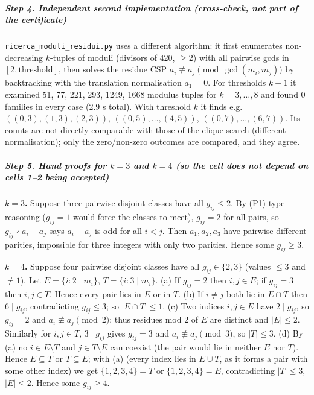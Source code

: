 \subparagraph{Step 4. Independent second implementation (cross-check,
not part of the
certificate)}\label{step-4.-independent-second-implementation-cross-check-not-part-of-the-certificate}

\texttt{ricerca\_moduli\_residui.py} uses a different algorithm: it
first enumerates non-decreasing \(k\)-tuples of moduli (divisors of 420,
\(\ge2\)) with all pairwise gcds in \([2,\text{threshold}]\), then
solves the residue CSP \(a_i\not\equiv a_j \pmod{\gcd(m_i,m_j)}\) by
backtracking with the translation normalisation \(a_1=0\). For
thresholds \(k-1\) it examined 51, 77, 221, 293, 1249, 1668 modulus
tuples for \(k=3,\dots,8\) and found 0 families in every case (2.9 s
total). With threshold \(k\) it finds e.g.~\(((0,3),(1,3),(2,3))\),
\(((0,5),\dots,(4,5))\), \(((0,7),\dots,(6,7))\). Its counts are not
directly comparable with those of the clique search (different
normalisation); only the zero/non-zero outcomes are compared, and they
agree.

\subparagraph{\texorpdfstring{Step 5. Hand proofs for \(k=3\) and
\(k=4\) (so the cell does not depend on cells 1--2 being
accepted)}{Step 5. Hand proofs for k=3 and k=4 (so the cell does not depend on cells 1--2 being accepted)}}\label{step-5.-hand-proofs-for-k3-and-k4-so-the-cell-does-not-depend-on-cells-12-being-accepted}

\textbf{\(k=3\).} Suppose three pairwise disjoint classes have all
\(g_{ij}\le 2\). By (P1)-type reasoning (\(g_{ij}=1\) would force the
classes to meet), \(g_{ij}=2\) for all pairs, so \(g_{ij}\nmid a_i-a_j\)
says \(a_i-a_j\) is odd for all \(i<j\). Then \(a_1,a_2,a_3\) have
pairwise different parities, impossible for three integers with only two
parities. Hence some \(g_{ij}\ge3\).

\textbf{\(k=4\).} Suppose four pairwise disjoint classes have all
\(g_{ij}\in\{2,3\}\) (values \(\le3\) and \(\ne1\)). Let
\(E=\{i: 2\mid m_i\}\), \(T=\{i:3\mid m_i\}\). (a) If \(g_{ij}=2\) then
\(i,j\in E\); if \(g_{ij}=3\) then \(i,j\in T\). Hence every pair lies
in \(E\) or in \(T\). (b) If \(i\ne j\) both lie in \(E\cap T\) then
\(6\mid g_{ij}\), contradicting \(g_{ij}\le3\); so \(|E\cap T|\le1\).
(c) Two indices \(i,j\in E\) have \(2\mid g_{ij}\), so \(g_{ij}=2\) and
\(a_i\not\equiv a_j\pmod 2\); thus residues mod 2 of \(E\) are distinct
and \(|E|\le2\). Similarly for \(i,j\in T\), \(3\mid g_{ij}\) gives
\(g_{ij}=3\) and \(a_i\not\equiv a_j \pmod 3\), so \(|T|\le3\). (d) By
(a) no \(i\in E\setminus T\) and \(j\in T\setminus E\) can coexist (the
pair would lie in neither \(E\) nor \(T\)). Hence \(E\subseteq T\) or
\(T\subseteq E\); with (a) (every index lies in \(E\cup T\), as it forms
a pair with some other index) we get \(\{1,2,3,4\}=T\) or
\(\{1,2,3,4\}=E\), contradicting \(|T|\le3\), \(|E|\le2\). Hence some
\(g_{ij}\ge4\).

